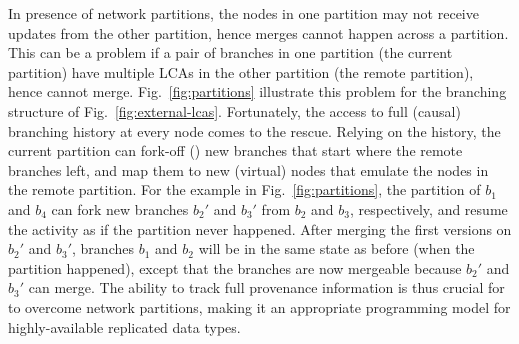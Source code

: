 In presence of network partitions, the nodes in one partition may not
receive updates from the other partition, hence merges cannot happen
across a partition. This can be a problem if a pair of branches in one
partition (the current partition) have multiple LCAs in the other
partition (the remote partition), hence cannot merge.
Fig.~\ref{fig:partitions} illustrate this problem for the branching
structure of Fig.~\ref{fig:external-lcas}. Fortunately, the access to
full (causal) branching history at every node comes to the rescue.
Relying on the history, the current partition can fork-off ()
new branches that start where the remote branches left, and map them
to new (virtual) nodes that emulate the nodes in the remote partition.
For the example in Fig.~\ref{fig:partitions}, the partition of $b_1$
and $b_4$ can fork new branches $b_2'$ and $b_3'$ from $b_2$ and
$b_3$, respectively, and resume the activity as if the partition never
happened. After merging the first versions on $b_2'$ and $b_3'$,
branches $b_1$ and $b_2$ will be in the same state as before (when the
partition happened), except that the branches are now mergeable
because $b_2'$ and $b_3'$ can merge. The ability to track full
provenance information is thus crucial for \name to overcome network
partitions, making it an appropriate programming model for
highly-available replicated data types.

